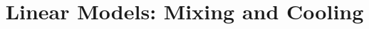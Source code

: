 \documentclass{beamer}
\title[Section 2.4]{Linear Models: Mixing and Cooling}
\begin{document}
\begin{frame}
\titlepage
\end{frame}
\end{document}
